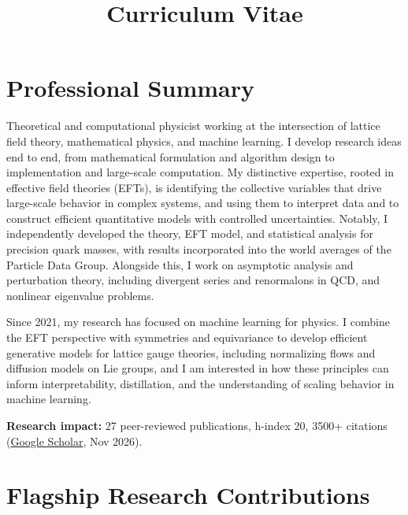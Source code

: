 \documentclass[12pt,a4paper,sans]{moderncv}
\title{Curriculum Vitae}
\begin{document}
\makecvtitle

\vspace{-0.3em}

\section{Professional Summary}

Theoretical and computational physicist working at the intersection of lattice field theory, mathematical physics, and machine learning. I develop research ideas end to end, from mathematical formulation and algorithm design to implementation and large-scale computation. My distinctive expertise, rooted in effective field theories (EFTs), is identifying the collective variables that drive large-scale behavior in complex systems, and using them to interpret data and to construct efficient quantitative models with controlled uncertainties. Notably, I independently developed the theory, EFT model, and statistical analysis for precision quark masses, with results incorporated into the world averages of the Particle Data Group. Alongside this, I work on asymptotic analysis and perturbation theory, including divergent series and renormalons in QCD, and nonlinear eigenvalue problems.

\vspace{0.4em}Since 2021, my research has focused on machine learning for physics. I combine the EFT perspective with symmetries and equivariance to develop efficient generative models for lattice gauge theories, including normalizing flows and diffusion models on Lie groups, and I am interested in how these principles can inform interpretability, distillation, and the understanding of scaling behavior in machine learning.

\vspace{0.5em}
\textbf{Research impact:} 27 peer-reviewed publications, h-index 20, 3500+ citations (\href{https://scholar.google.com/citations?user=EBV_Sl0AAAAJ&hl=en}{Google Scholar}, Nov 2026).


\section{Flagship Research Contributions}
\end{document}
